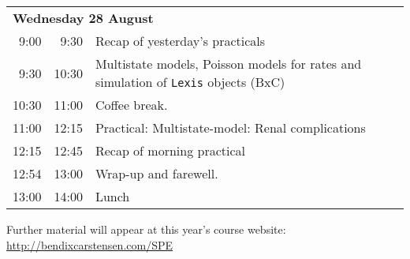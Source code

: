 \noindent
\begin{tabular}{r@{ -- }rp{13cm}}
\multicolumn{3}{l}{\bf Wednesday 28 August} \\
 9:00 &  9:30 & Recap of yesterday's practicals \\
 9:30 & 10:30 & Multistate models, Poisson models for rates and
                simulation of \texttt{Lexis} objects (BxC)\\
10:30 & 11:00 & Coffee break. \\
11:00 & 12:15 & Practical: Multistate-model: Renal complications\\
12:15 & 12:45 & Recap of morning practical \\
12:54 & 13:00 & Wrap-up and farewell.\\
13:00 & 14:00 & Lunch \\
\end{tabular}
\vfill
\noindent
Further material will appear at this year's course website:\\ 
\url{http://bendixcarstensen.com/SPE}
